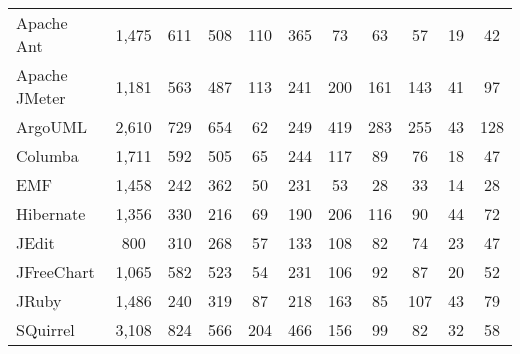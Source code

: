 \begin{table}[h]
\begin{minipage}{\textwidth}
\begin{center}
\begin{tabular}{l| c c c c c c c c c c}
        Apache Ant     & 1,475 & 611 & 508 & 110 & 365 & 73  & 63  & 57  & 19 & 42    \\
        Apache JMeter  & 1,181 & 563 & 487 & 113 & 241 & 200 & 161 & 143 & 41 & 97    \\
        ArgoUML        & 2,610 & 729 & 654 & 62  & 249 & 419 & 283 & 255 & 43 & 128   \\
        Columba        & 1,711 & 592 & 505 & 65  & 244 & 117 & 89  & 76  & 18 & 47    \\
        EMF            & 1,458 & 242 & 362 & 50  & 231 & 53  & 28  & 33  & 14 & 28    \\
        Hibernate      & 1,356 & 330 & 216 & 69  & 190 & 206 & 116 & 90  & 44 & 72    \\
        JEdit          & 800   & 310 & 268 & 57  & 133 & 108 & 82  & 74  & 23 & 47    \\
        JFreeChart     & 1,065 & 582 & 523 & 54  & 231 & 106 & 92  & 87  & 20 & 52    \\
        JRuby          & 1,486 & 240 & 319 & 87  & 218 & 163 & 85  & 107 & 43 & 79    \\
        SQuirrel       & 3,108 & 824 & 566 & 204 & 466 & 156 & 99  & 82  & 32 & 58    \\
                       

        \bottomrule
        \end{tabular}
    \end{center}
  \end{minipage}    
\end{table} 


